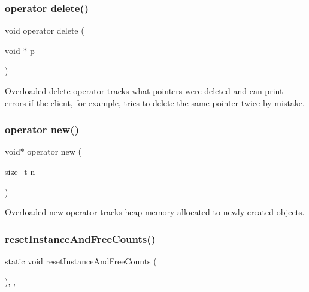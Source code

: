 \subsubsection{\texorpdfstring{operator delete()}{operator delete()}}
{\footnotesize\ttfamily void operator delete (\begin{DoxyParamCaption}\item[{void $\ast$}]{p }\end{DoxyParamCaption})\hspace{0.3cm}{\ttfamily [inline]}}



Overloaded delete operator tracks what pointers were deleted and can print errors if the client, for example, tries to delete the same pointer twice by mistake. 

\mbox{\label{classManaged_a94f5168cf29183b0ae2ea3a3731c317a}} 
\subsubsection{\texorpdfstring{operator new()}{operator new()}}
{\footnotesize\ttfamily void$\ast$ operator new (\begin{DoxyParamCaption}\item[{size\+\_\+t}]{n }\end{DoxyParamCaption})\hspace{0.3cm}{\ttfamily [inline]}}



Overloaded new operator tracks heap memory allocated to newly created objects. 

\mbox{\label{classManaged_a0c190bc9c1baf9176a72b63e3ba0d985}} 
\subsubsection{\texorpdfstring{reset\+Instance\+And\+Free\+Counts()}{resetInstanceAndFreeCounts()}}
{\footnotesize\ttfamily static void reset\+Instance\+And\+Free\+Counts (\begin{DoxyParamCaption}{ }\end{DoxyParamCaption})\hspace{0.3cm}{\ttfamily [inline]}, {\ttfamily [static]}, {\ttfamily [protected]}}



